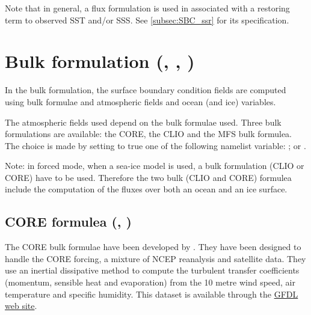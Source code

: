 \documentclass[../tex_main/NEMO_manual]{subfiles}
\begin{document}
Note that in general, a flux formulation is used in associated with a restoring term to observed SST and/or SSS.
See \autoref{subsec:SBC_ssr} for its specification.


\section[Bulk formulation {(\textit{sbcblk\{\_core,\_clio,\_mfs\}.F90})}]
			{Bulk formulation {(\protect{}, \protect{}, \protect{})}}
\label{sec:SBC_blk}

In the bulk formulation, the surface boundary condition fields are computed using bulk formulae and atmospheric fields and ocean (and ice) variables.

The atmospheric fields used depend on the bulk formulae used.
Three bulk formulations are available:
the CORE, the CLIO and the MFS bulk formulea.
The choice is made by setting to true one of the following namelist variable:
 ;  or  .

Note:
in forced mode, when a sea-ice model is used, a bulk formulation (CLIO or CORE) have to be used.
Therefore the two bulk (CLIO and CORE) formulea include the computation of the fluxes over
both an ocean and an ice surface. 

\subsection{CORE formulea (\protect{}, \protect{})}
\label{subsec:SBC_blk_core}
%

The CORE bulk formulae have been developed by \citet{Large_Yeager_Rep04}.
They have been designed to handle the CORE forcing, a mixture of NCEP reanalysis and satellite data.
They use an inertial dissipative method to compute the turbulent transfer coefficients
(momentum, sensible heat and evaporation) from the 10 metre wind speed, air temperature and specific humidity.
This \citet{Large_Yeager_Rep04} dataset is available through
the \href{http://nomads.gfdl.noaa.gov/nomads/forms/mom4/CORE.html}{GFDL web site}.
\end{document}
